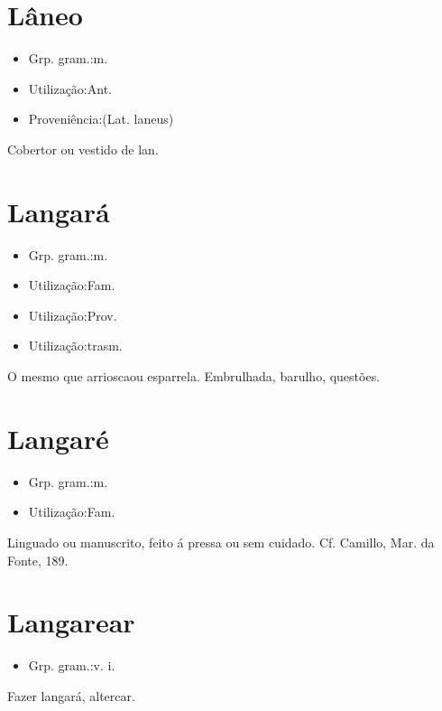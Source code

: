\section{Lâneo}
\begin{itemize}
\item {Grp. gram.:m.}
\end{itemize}
\begin{itemize}
\item {Utilização:Ant.}
\end{itemize}
\begin{itemize}
\item {Proveniência:(Lat. \textunderscore laneus\textunderscore )}
\end{itemize}
Cobertor ou vestido de lan.
\section{Langará}
\begin{itemize}
\item {Grp. gram.:m.}
\end{itemize}
\begin{itemize}
\item {Utilização:Fam.}
\end{itemize}
\begin{itemize}
\item {Utilização:Prov.}
\end{itemize}
\begin{itemize}
\item {Utilização:trasm.}
\end{itemize}
O mesmo que \textunderscore arriosca\textunderscore  ou \textunderscore esparrela\textunderscore .
Embrulhada, barulho, questões.
\section{Langaré}
\begin{itemize}
\item {Grp. gram.:m.}
\end{itemize}
\begin{itemize}
\item {Utilização:Fam.}
\end{itemize}
Linguado ou manuscrito, feito á pressa ou sem cuidado. Cf. Camillo, \textunderscore Mar. da Fonte\textunderscore , 189.
\section{Langarear}
\begin{itemize}
\item {Grp. gram.:v. i.}
\end{itemize}
Fazer langará, altercar.
